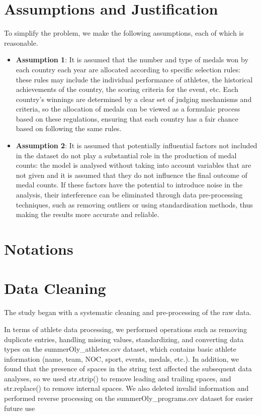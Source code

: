 \documentclass{mcmthesis}
\begin{document}
\section{Assumptions and Justification}
To simplify the problem, we make the following assumptions, each of which is reasonable. 

\begin{itemize}
\item {\bf Assumption 1}: It is assumed that the number and type of medals won by each country each year are allocated according to specific selection rules: these rules may include the individual performance of athletes, the historical achievements of the country, the scoring criteria for the event, etc. Each country's winnings are determined by a clear set of judging mechanisms and criteria, so the allocation of medals can be viewed as a formulaic process based on these regulations, ensuring that each country has a fair chance based on following the same rules.
    
\item {\bf Assumption 2}: It is assumed that potentially influential factors not included in the dataset do not play a substantial role in the production of medal counts: the model is analysed without taking into account variables that are not given and it is assumed that they do not influence the final outcome of medal counts. If these factors have the potential to introduce noise in the analysis, their interference can be eliminated through data pre-processing techniques, such as removing outliers or using standardisation methods, thus making the results more accurate and reliable.
\end{itemize}
\section{Notations}

\section{Data Cleaning}
The study began with a systematic cleaning and pre-processing of the raw data.

In terms of athlete data processing, we performed operations such as removing duplicate entries, handling missing values, standardizing, and converting data types on the summerOly\_athletes.csv dataset, which contains basic athlete information (name, team, NOC, sport, events, medals, etc.). In addition, we found that the presence of spaces in the string text affected the subsequent data analyses, so we used str.strip() to remove leading and trailing spaces, and str.replace() to remove internal spaces. We also deleted invalid information and performed reverse processing on the summerOly\_programs.csv dataset for easier future use
\end{document}
